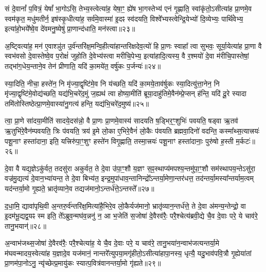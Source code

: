 सं दे॒वानां᳚ प॒वित्रं॒ येषां᳚ भा॒गो\-ऽसि॒ तेभ्य॒स्त्वेत्या॑ह॒ येषा॒ꣳ॒ ह्ये॑ष भा॒गस्तेभ्य॑ एनं गृ॒ह्णाति॒ स्वांकृ॑तो॒\-ऽसीत्या॑ह प्रा॒णमे॒व स्वम॑कृत॒ मधु॑मतीर्न॒ इष॑स्कृ॒धीत्या॑ह॒ सर्व॑मे॒वास्मा॑ इ॒दꣴ स्व॑दयति॒ विश्वे᳚भ्यस्त्वेन्द्रि॒येभ्यो॑ दि॒व्येभ्यः॒ पार्थि॑वेभ्य॒ इत्या॑हो॒भये᳚ष्वे॒व दे॑वमनु॒ष्येषु॑ प्रा॒णान्द॑धाति॒ मन॑स्त्वा॥२३॥

अ॒ष्ट्वित्या॑ह॒ मन॑ ए॒वाश्ञु॑त उ॒र्व॑न्तरि॑क्ष॒मन्वि॒हीत्या॑हान्तरिक्षदेव॒त्यो॑ हि प्रा॒णः स्वाहा᳚ त्वा सुभवः॒ सूर्या॒येत्या॑ह प्रा॒णा वै स्वभ॑वसो दे॒वास्तेष्वे॒व प॒रोक्षं॑ जुहोति दे॒वेभ्य॑स्त्वा मरीचि॒पेभ्य॒ इत्या॑हादि॒त्यस्य॒ वै र॒श्मयो॑ दे॒वा म॑रीचि॒पास्तेषां॒ तद्भा॑ग॒धेय॒न्ताने॒व तेन॑ प्रीणाति॒ यदि॑ का॒मये॑त॒ वर्\mbox{}षु॑कः प॒र्जन्यः॑॥२४॥

स्या॒दिति॒ नीचा॒ हस्ते॑न॒ नि मृ॑ज्या॒द्वृष्टि॑मे॒व नि य॑च्छति॒ यदि॑ का॒मये॒ताव॑र्\mbox{}षुकः स्या॒दित्यु॑त्ता॒नेन॒ नि मृ॑ज्या॒द्वृष्टि॑मे॒वोद्य॑च्छति॒ यद्य॑भि॒चरे॑द॒मुं ज॒ह्यथ॑ त्वा होष्या॒मीति॑ ब्रूया॒दाहु॑तिमे॒वैन॑म्प्रे॒प्सन् ह॑न्ति॒ यदि॑ दू॒रे स्यादा तमि॑तोस्तिष्ठेत्प्रा॒णमे॒वास्या॑नु॒गत्य॑ हन्ति॒ यद्य॑भि॒चरे॑द॒मुष्य॑॥२५॥

त्वा॒ प्रा॒णे सा॑दया॒मीति॑ सादये॒दस॑न्नो॒ वै प्रा॒णः प्रा॒णमे॒वास्य॑ सादयति ष॒ड्भिर॒ꣳ॒शुभिः॑ पवयति॒ षड्वा ऋ॒तव॑ ऋ॒तुभि॑रे॒वैन॑म्पवयति॒ त्रिः प॑वयति॒ त्रय॑ इ॒मे लो॒का ए॒भिरे॒वैनं॑ लो॒कैः प॑वयति ब्रह्मवा॒दिनो॑ वदन्ति॒ कस्मा᳚थ्स॒त्यात्त्रयः॑ पशू॒नाꣳ हस्ता॑दाना॒ इति॒ यत्त्रिरु॑पा॒ꣳ॒शुꣳ हस्ते॑न विगृ॒ह्णाति॒ तस्मा॒त्त्रयः॑ पशू॒नाꣳ हस्ता॑दानाः॒ पुरु॑षो ह॒स्ती म॒र्कटः॑॥२६॥

{\anuvakamend[{माध्य॑न्दिनम॒ष्टाव॑ष्टावे॒ष मन॑स्त्वा प॒र्जन्यो॒\-ऽमुष्य॒ पुरु॑षो॒ द्वे च॑॥५॥}]}

दे॒वा वै यद्य॒ज्ञे\-ऽकु॑र्वत॒ तदसु॑रा अकुर्वत॒ ते दे॒वा उ॑पा॒ꣳ॒शौ य॒ज्ञꣳ स॒ꣴ॒स्थाप्य॑मपश्य॒न्तमु॑पा॒ꣳ॒शौ सम॑स्थापय॒न्ते\-ऽसु॑रा॒ वज्र॑मु॒द्यत्य॑ दे॒वान॒भ्या॑यन्त॒ ते दे॒वा बिभ्य॑त॒ इन्द्र॒मुपा॑धाव॒न्तानिन्द्रो᳚\-ऽन्तर्या॒मेणा॒न्तर॑धत्त॒ तद॑न्तर्या॒मस्या᳚न्तर्याम॒त्वम् यद॑न्तर्या॒मो गृ॒ह्यते॒ भ्रातृ॑व्याने॒व तद्यज॑मानो॒\-ऽन्तर्ध॑त्ते॒\-ऽन्तस्ते᳚॥२७॥

द॒धा॒मि॒ द्यावा॑पृथि॒वी अ॒न्तरु॒र्व॑न्तरि॑क्ष॒मित्या॑है॒भिरे॒व लो॒कैर्यज॑मानो॒ भ्रातृ॑व्यान॒न्तर्ध॑त्ते॒ ते दे॒वा अ॑मन्य॒न्तेन्द्रो॒ वा इ॒दम॑भू॒द्यद्व॒यꣴ स्म इति॒ ते᳚\-ऽब्रुव॒न्मघ॑व॒न्ननु॑ न॒ आ भ॒जेति॑ स॒जोषा॑ दे॒वैरव॑रैः॒ परै॒श्चेत्य॑ब्रवी॒द्ये चै॒व दे॒वाः परे॒ ये चाव॑रे॒ तानु॒भयान्॑॥२८॥

अ॒न्वाभ॑जथ्स॒जोषा॑ दे॒वैरव॑रैः॒ परै॒श्चेत्या॑ह॒ ये चै॒व दे॒वाः परे॒ य चाव॑रे॒ तानु॒भया॑न॒न्वाभ॑जत्यन्तर्या॒मे म॑घवन्मादय॒स्वेत्या॑ह य॒ज्ञादे॒व यज॑मानं॒ नान्तरे᳚त्युपया॒मगृ॑हीतो॒\-ऽसीत्या॑हापा॒नस्य॒ धृत्यै॒ यदु॒भाव॑पवि॒त्रौ गृ॒ह्येया॑तां प्रा॒णम॑पा॒नो\-ऽनु॒ न्यृ॑च्छेत्प्र॒मायु॑कः स्यात्प॒वित्र॑वानन्तर्या॒मो गृ॑ह्यते॥२९॥

